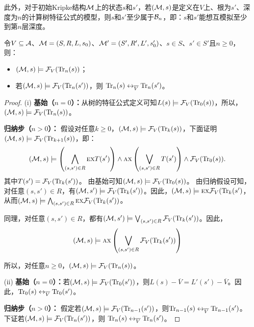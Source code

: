 此外，对于初始Kripke结构${\cal M}$上的状态$s$和$s'$，若$({\cal M},s)$是定义在$V$上、根为$s'$、深度为$n$的计算树特征公式的模型，则$s$和$s'$至少属于${\cal B}_n$，即：$s$和$s'$能想互模拟至少到第$n$层深度。

\begin{lemma}\label{Bn:to:Tn}
	令$V\subseteq {\cal A}$、${\cal M}=(S, R, L,s_0)$、${\cal M}'=(S', R', L',s_0')$、$s\in S$、$s'\in S'$且$n\ge 0$，则：
	\begin{itemize}
		\item[(i)] $({\cal M},s)\models{\cal F}_V(\textrm{Tr}_n(s))$；
		\item[(ii)] 若$({\cal M},s)\models{\cal F}_V(\textrm{Tr}_n(s'))$，则
		$\textrm{Tr}_n(s) \leftrightarrow_{\overline V} \textrm{Tr}_n(s')$。
	\end{itemize}
\end{lemma}
\begin{proof}
	(i) \textbf{基始（$n=0$）：}从树的特征公式定义可知$L(s) \models {\cal F}_V(\textrm{Tr}_0(s))$，所以，$({\cal M},s)\models{\cal F}_V(\textrm{Tr}_n(s))$。
	
	\textbf{归纳步（$n>0$）：} 假设对任意$k\geq 0$，$({\cal M},s)\models{\cal F}_V(\textrm{Tr}_k(s))$，下面证明$({\cal M},s)\models{\cal F}_V(\textrm{Tr}_{k+1}(s))$，即：
	\begin{equation*}
		({\cal M},s)\models \left(\bigwedge_{(s,s')\in R}
		\textsc{e} \textsc{x} T(s')\right)
		\wedge \textsc{a} \textsc{x}\left(\bigvee_{(s,s')\in R}
		T(s')\right)
		\wedge {\cal F}_V(\textrm{Tr}_0(s)).
	\end{equation*}
	其中$T(s') ={\cal F}_V(\textrm{Tr}_k(s'))$。 
	由基始可知$({\cal M},s)\models {\cal F}_V(\textrm{Tr}_0(s))$。
	由归纳假设可知，对任意$(s,s') \in R$，有$({\cal M}, s') \models {\cal F}_V(\textrm{Tr}_k(s'))$。因此，$({\cal M},s)\models \textsc{e} \textsc{x} {\cal F}_V(\textrm{Tr}_k(s')$，从而$({\cal M},s)\models \bigwedge_{(s,s')\in R}
	\textsc{e} \textsc{x} {\cal F}_V(\textrm{Tr}_k(s'))$。
	
	同理，对任意$(s,s') \in R$，都有$({\cal M}, s') \models \bigvee_{(s,s')\in R} {\cal F}_V(\textrm{Tr}_k(s') )$。因此，
	$$({\cal M},s)\models \textsc{a} \textsc{x}\left(\bigvee_{(s,s')\in R}
	{\cal F}_V(\textrm{Tr}_k(s') )\right)$$
	
	所以，对任意$n\geq 0$，$({\cal M},s)\models{\cal F}_V(\textrm{Tr}_n(s))$。
	
	
	
	(ii) \textbf{基始（$n=0$）：}若$({\cal M}, s)  \models {\cal F}_V(\textrm{Tr}_0(s'))$，则$L(s) - \overline V = L'(s') - \overline V$。因此，$\textrm{Tr}_0(s) \leftrightarrow_{\overline V} \textrm{Tr}_0(s')$。
	
	\textbf{归纳步（$n>0$）：} 假定若$({\cal M},s)\models{\cal F}_V(\textrm{Tr}_{n-1}(s'))$，则$\textrm{Tr}_{n-1}(s) \leftrightarrow_{\overline V} \textrm{Tr}_{n-1}(s')$。下证若$({\cal M},s)\models{\cal F}_V(\textrm{Tr}_n(s'))$，则
	$\textrm{Tr}_n(s) \leftrightarrow_{\overline V} \textrm{Tr}_n(s')$。
	

\end{proof}
